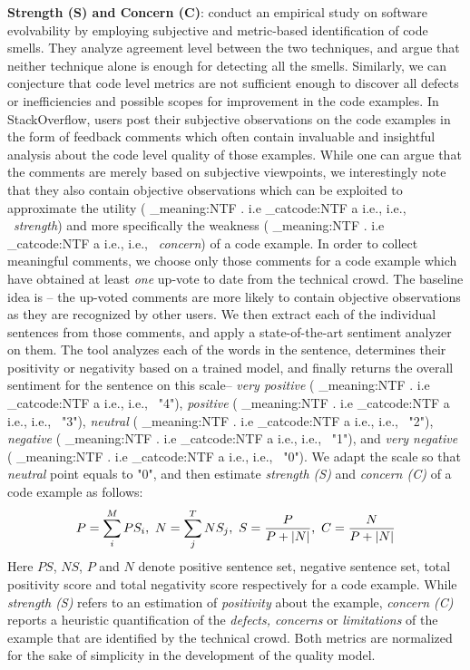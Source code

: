 \documentclass[conference]{IEEEtran}
\makeatletter
\newcommand\latinabbrev[1]{
  \peek_meaning:NTF . {%
    #1\@}%
  { \peek_catcode:NTF a {%
      #1., \@ }%
    {#1., \@}}}
\def\ie{\latinabbrev{i.e}}
\makeatother
\begin{document}
\textbf{Strength (S) and Concern (C)}: \citet{subjective} conduct an empirical study on software evolvability by employing subjective and metric-based identification of code smells.
They analyze agreement level between the two techniques, and argue that neither technique alone is enough for detecting all the smells. 
Similarly, we can conjecture that code level metrics are not sufficient enough to discover all defects or inefficiencies and possible scopes for improvement in the code examples. 
In StackOverflow, users post their subjective observations on the code examples in the form of feedback comments 
which often contain invaluable and insightful analysis about the code level quality of those examples. While one can argue that the comments are merely based on subjective viewpoints, we interestingly note that they also contain objective observations which can be exploited to approximate the utility (\ie\ \emph{strength}) and more specifically the weakness (\ie\ \emph{concern}) of a code example. In order to collect meaningful comments, we choose only those comments for a code example which have obtained at least \emph{one} up-vote to date from the technical crowd. 
The baseline idea is -- the up-voted comments are more likely to contain objective observations as they are recognized by other users. 
We then extract each of the individual sentences from those comments, and apply a state-of-the-art sentiment analyzer \cite{sentiment} on them. The tool analyzes each of the words in the sentence, determines their positivity or negativity based on a trained model, and finally returns the overall sentiment for the sentence on this scale-- \emph{very positive} (\ie\ "4"), \emph{positive} (\ie\ "3"), \emph{neutral} (\ie\ "2"), \emph{negative} (\ie\ "1"), and \emph{very negative} (\ie\ "0"). We adapt the scale so that \emph{neutral} point equals to "0",  and then estimate \emph{strength (S)} and \emph{concern (C)} of a code example as follows:  
\begin{equation*}
\setlength{\abovedisplayskip}{0pt}
\setlength{\belowdisplayskip}{0pt}
P=\sum_{i}^{M}PS_{i}, ~N=\sum_{j}^{T}NS_{j}, ~S=\frac{P}{P+ |N|}, ~C=\frac{N}{P+|N|} 
\end{equation*}
Here $PS$, $NS$, $P$ and $N$ denote positive sentence set, negative sentence set, total positivity score and total negativity score respectively for a code example. While \emph{strength (S)} refers to an estimation of \emph{positivity} about the example, \emph{concern (C)} reports
a heuristic quantification of the \emph{defects, concerns} or \emph{limitations} of the example that are identified by the technical crowd. Both metrics are normalized for the sake of simplicity in the development of the quality model.
\end{document}
